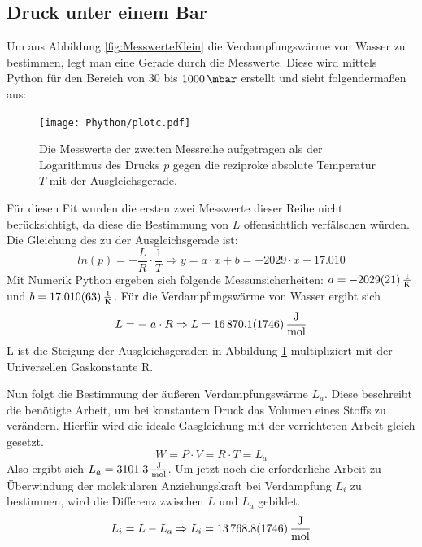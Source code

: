 \subsection{Druck unter einem Bar}
Um aus Abbildung \ref{fig:MesswerteKlein} die Verdampfungswärme von Wasser zu bestimmen, legt man eine Gerade durch die Messwerte.
Diese wird mittels Python für den Bereich von $30$ bis $\SI{1000}{\mbar}$ erstellt und sieht folgendermaßen aus: \\
\begin{figure}[H]
  \centering
  \texttt{[image: Phython/plotc.pdf]}
  \caption{Die Messwerte der zweiten Messreihe aufgetragen als der Logarithmus des Drucks $p$
  gegen die reziproke absolute Temperatur $T$ mit der Ausgleichsgerade.}
  \label{fig:Ausgleichsgerade}
\end{figure}
Für diesen Fit wurden die ersten zwei Messwerte dieser Reihe nicht berücksichtigt, da diese die Bestimmung von $L$
offensichtlich verfälschen würden.
Die Gleichung des zu der Ausgleichsgerade ist:
\begin{equation}
  ln(p) = - \frac{L}{R} \cdot \frac{1}{T}
  \Rightarrow y = a \cdot x + b = -2029 \cdot x + 17.010
\end{equation}
Mit Numerik Python ergeben sich folgende Messunsicherheiten: $a = \SI{-2029 \pm 21 }{\frac{1}{\kelvin}}$
und $b = \SI{17.010 \pm 0.063}{\frac{1}{\kelvin}}$.
Für die Verdampfungswärme von Wasser ergibt sich
\begin{equation*}
  L = - \ a \cdot R \Rightarrow L = \SI{16870.1 \pm 174.6}{\frac{\J}{\mol}}
\end{equation*}
L ist die Steigung der Ausgleichsgeraden in Abbildung \ref{fig:Ausgleichsgerade} multipliziert mit der Universellen Gaskonstante R.

Nun folgt die Bestimmung der äußeren Verdampfungswärme $L_a$.
Diese beschreibt die benötigte Arbeit, um bei konstantem Druck das Volumen eines Stoffs zu verändern.
Hierfür wird die ideale Gasgleichung mit der verrichteten Arbeit gleich gesetzt.
\begin{equation}
    W = P \cdot V = R \cdot T = L_a
\end{equation}
Also ergibt sich $L_a = \SI{3101.3}{\frac{\J}{\mol}}$.
Um jetzt noch die erforderliche Arbeit zu Überwindung der molekularen Anziehungskraft bei Verdampfung $L_i$ zu bestimmen, wird
    die Differenz zwischen $L$ und $L_a$ gebildet.
\begin{equation}
    L_i = L - L_a \Rightarrow L_i = \SI{13768.8 \pm 174.6}{\frac{\J}{\mol}}
\end{equation}

